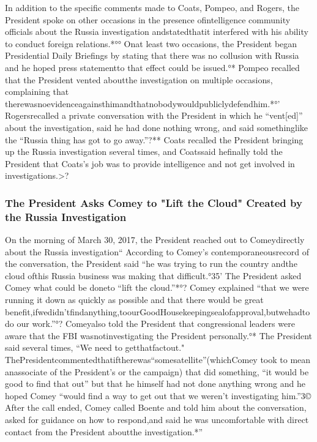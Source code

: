 In addition to the specific comments made to Coats, Pompeo, and Rogers, the President spoke on other occasions in the presence ofintelligence community officials about the Russia investigation andstatedthatit interfered with his ability to conduct foreign relations.*°°
Onat least two occasions, the President began Presidential Daily Briefings by stating that there was no collusion with Russia and he hoped press statementto that effect could be issued.°*
Pompeo recalled that the President vented aboutthe investigation on multiple occasions, complaining that therewasnoevidenceagainsthimandthatnobodywouldpubliclydefendhim.*°’
Rogersrecalled a private conversation with the President in which he “vent[ed]” about the investigation, said he had done nothing wrong, and said somethinglike the “Russia thing has got to go away.”?**
Coats recalled the President bringing up the Russia investigation several times, and Coatssaid hefinally told the President that Coats’s job was to provide intelligence and not get involved in investigations.>?

\subsubsection{The President Asks Comey to "Lift the Cloud" Created by the Russia Investigation}

On the morning of March 30, 2017, the President reached out to Comeydirectly about the Russia investigation“ According to Comey’s contemporaneousrecord of the conversation, the President said “he was trying to run the country andthe cloud ofthis Russia business was making that difficult.°35'
The President asked Comey what could be doneto “lift the cloud.”*°?
Comey explained “that we were running it down as quickly as possible and that there would be great benefit,ifwedidn’tfindanything,toourGoodHousekeepingsealofapproval,butwehadtodo our work.”°?
Comeyalso told the President that congressional leaders were aware that the FBI wasnotinvestigating the President personally.°*
The President said several times, “We need to getthatfactout."
ThePresidentcommentedthatiftherewas“somesatellite”(whichComey took to mean anassociate of the President’s or the campaign) that did something, “it would be good to find that out” but that he himself had not done anything wrong and he hoped Comey “would find a way to get out that we weren’t investigating him.”3©
After the call ended, Comey called Boente and told him about the conversation, asked for guidance on how to respond,and said he was uncomfortable with direct contact from the President aboutthe investigation.*”

